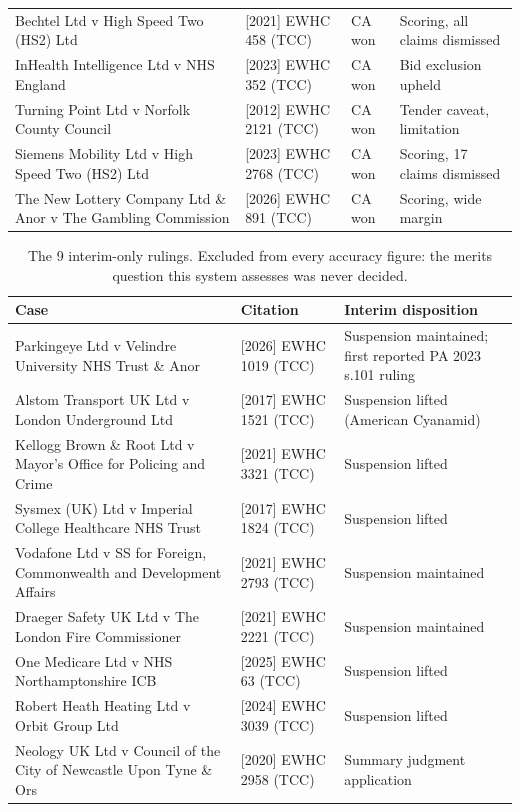 \begin{table}[htbp]
\begin{tabular}{@{}p{5.3cm}p{3.0cm}p{1.3cm}p{3.5cm}@{}}
Bechtel Ltd v High Speed Two (HS2) Ltd &
  [2021] EWHC 458 (TCC) & CA won & Scoring, all claims dismissed \\
InHealth Intelligence Ltd v NHS England &
  [2023] EWHC 352 (TCC) & CA won & Bid exclusion upheld \\
Turning Point Ltd v Norfolk County Council &
  [2012] EWHC 2121 (TCC) & CA won & Tender caveat, limitation \\
Siemens Mobility Ltd v High Speed Two (HS2) Ltd &
  [2023] EWHC 2768 (TCC) & CA won & Scoring, 17 claims dismissed \\
The New Lottery Company Ltd \& Anor v The Gambling Commission &
  [2026] EWHC 891 (TCC) & CA won & Scoring, wide margin \\
\bottomrule
\end{tabular}
\end{table}

\begin{table}[htbp]
\centering
\scriptsize
\caption[Interim-only cases]{The 9 interim-only rulings. Excluded from every
accuracy figure: the merits question this system assesses was never decided.}
\label{tab:corpus-interim}
\begin{tabular}{@{}p{5.6cm}p{3.0cm}p{4.4cm}@{}}
\toprule
\textbf{Case} & \textbf{Citation} & \textbf{Interim disposition} \\
\midrule
Parkingeye Ltd v Velindre University NHS Trust \& Anor &
  [2026] EWHC 1019 (TCC) & Suspension maintained; first reported PA 2023 s.101 ruling \\
Alstom Transport UK Ltd v London Underground Ltd &
  [2017] EWHC 1521 (TCC) & Suspension lifted (American Cyanamid) \\
Kellogg Brown \& Root Ltd v Mayor's Office for Policing and Crime &
  [2021] EWHC 3321 (TCC) & Suspension lifted \\
Sysmex (UK) Ltd v Imperial College Healthcare NHS Trust &
  [2017] EWHC 1824 (TCC) & Suspension lifted \\
Vodafone Ltd v SS for Foreign, Commonwealth and Development Affairs &
  [2021] EWHC 2793 (TCC) & Suspension maintained \\
Draeger Safety UK Ltd v The London Fire Commissioner &
  [2021] EWHC 2221 (TCC) & Suspension maintained \\
One Medicare Ltd v NHS Northamptonshire ICB &
  [2025] EWHC 63 (TCC) & Suspension lifted \\
Robert Heath Heating Ltd v Orbit Group Ltd &
  [2024] EWHC 3039 (TCC) & Suspension lifted \\
Neology UK Ltd v Council of the City of Newcastle Upon Tyne \& Ors &
  [2020] EWHC 2958 (TCC) & Summary judgment application \\
\bottomrule
\end{tabular}
\end{table}

